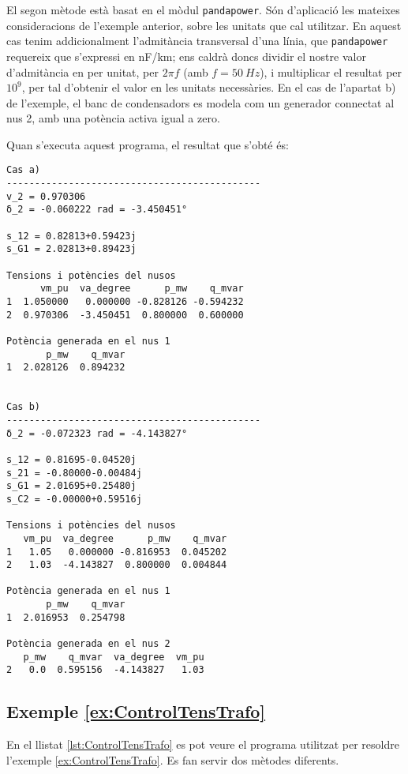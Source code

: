 El segon mètode està basat en el mòdul \texttt{pandapower}. Són d'aplicació les mateixes consideracions de l'exemple anterior, sobre les unitats que cal utilitzar. En aquest cas tenim addicionalment l'admitància transversal d'una línia, que \texttt{pandapower} requereix que s'expressi en \unit{nF/km}; ens caldrà doncs dividir el nostre valor d'admitància en per unitat, per $2 \pi f$ (amb $f = \qty{50}{Hz}$), i multiplicar el resultat per $10^9$, per tal d'obtenir el valor en les unitats necessàries. En el cas de l'apartat  b) de l'exemple, el banc de condensadors es modela com un generador connectat al nus 2, amb una potència activa  igual a zero.




Quan s'executa aquest programa, el resultat que s'obté és:
\lstset{
	language=,
	numbers=none,
	frame=none
}
\begin{lstlisting}
Cas a)
---------------------------------------------
v_2 = 0.970306
δ_2 = -0.060222 rad = -3.450451°

s_12 = 0.82813+0.59423j
s_G1 = 2.02813+0.89423j

Tensions i potències del nusos
      vm_pu  va_degree      p_mw    q_mvar
1  1.050000   0.000000 -0.828126 -0.594232
2  0.970306  -3.450451  0.800000  0.600000

Potència generada en el nus 1
       p_mw    q_mvar
1  2.028126  0.894232


Cas b)
---------------------------------------------
δ_2 = -0.072323 rad = -4.143827°

s_12 = 0.81695-0.04520j
s_21 = -0.80000-0.00484j
s_G1 = 2.01695+0.25480j
s_C2 = -0.00000+0.59516j

Tensions i potències del nusos
   vm_pu  va_degree      p_mw    q_mvar
1   1.05   0.000000 -0.816953  0.045202
2   1.03  -4.143827  0.800000  0.004844

Potència generada en el nus 1
       p_mw    q_mvar
1  2.016953  0.254798

Potència generada en el nus 2
   p_mw    q_mvar  va_degree  vm_pu
2   0.0  0.595156  -4.143827   1.03
\end{lstlisting} 


\hypertarget{exemple:ControlTensTrafo}{\subsection{Exemple \ref*{ex:ControlTensTrafo} \ControlTensTrafo}}
En el llistat \vref{lst:ControlTensTrafo} es pot veure el programa utilitzat per resoldre l'exemple \vref{ex:ControlTensTrafo}. Es fan servir dos mètodes diferents.

